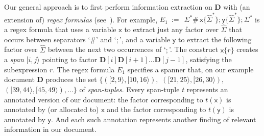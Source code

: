 \documentclass[
a4paper
]{article}
\theoremstyle{plain}
\theoremstyle{definition}
\theoremstyle{remark}
\newcommand{\firstExampleEx}{E_1}
\newcommand{\doc}{\ensuremath{\mathbf{D}}}
\newcommand{\spann}[2]{\ensuremath{[#1,#2\rangle}}
\newcommand{\varsx}{\ensuremath{\textsf{x}}}
\newcommand{\varsy}{\ensuremath{\textsf{y}}}
\begin{document}
\medskip

Our general approach is to first perform information extraction on $\doc$ with (an extension of) \emph{regex formulas} (see~\cite{fagin2015document}). For example, $\firstExampleEx \ := \ \ \Sigma^* \# \, \varsx\{\widehat{\Sigma}^*\}; \varsy\{\widehat{\Sigma}^*\}; \Sigma^*$
is a regex formula that uses a variable $\varsx$ to extract just any factor over $\widehat{\Sigma}$ that occurs between separators `$\#$' and `$;$', and a variable $\varsy$ to extract the following factor over $\widehat{\Sigma}$ between the next two occurrences of `$;$'. The construct $\varsx\{r\}$ creates a \emph{span} $\spann{i}{j}$ pointing to factor $\doc[i] \doc[i+1] \ldots \doc[j-1]$, satisfying the subexpression $r$. 
The regex formula $\firstExampleEx$ specifies a spanner that, on our example document $\doc$
produces the set $\{(\spann{2}{9}, \spann{10}{16}),$ $(\spann{21}{25},\spann{26}{30}),$ $(\spann{39}{44}, \spann{45}{49}), \ldots\}$
of \emph{span-tuples}. Every span-tuple $t$ represents an annotated version of our document: the factor corresponding to $t(\varsx)$ is annotated by (or allocated to) $\varsx$ and the factor corresponding to $t(\varsy)$ is annotated by $\varsy$. And each such annotation represents another finding of relevant information in our document.
\end{document}
